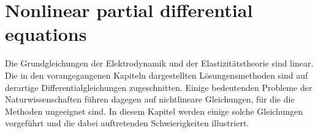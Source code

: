%
%
%
\chapter{Nonlinear partial differential equations\label{chapter-nichtlinear}}
\rhead{}
Die Grundgleichungen der Elektrodynamik und der Elastizitätstheorie
sind linear. Die in den vorangegangenen Kapiteln dargestellten
Lösungensmethoden sind auf derartige Differentialgleichungen
zugeschnitten. Einige bedeutenden Probleme der Naturwissenschaften
führen dagegen auf nichtlineare Gleichungen, für die die
Methoden ungeeignet sind. In diesem Kapitel werden einige
solche Gleichungen vorgeführt und die dabei auftretenden
Schwierigkeiten illustriert.









